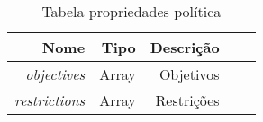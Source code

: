 \begin{table}[!htb]
    \centering
    \caption[resource-optimization-shape]{Tabela propriedades política
    \label{tab:tabela-optimization}}
    \begin{tabular}{rrrrr}
        \toprule
            Nome & Tipo & Descrição \\ 
        \midrule
            \textit{objectives} & Array & Objetivos \\
            \textit{restrictions} & Array &  Restrições \\
        \bottomrule
    \end{tabular}
\end{table}


